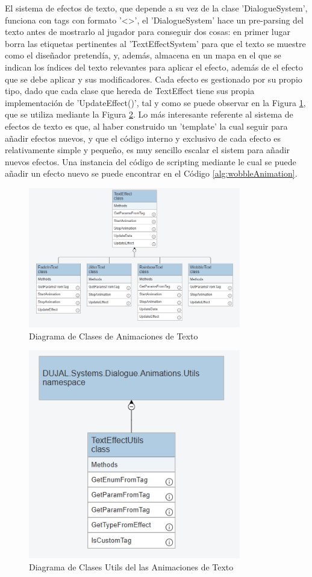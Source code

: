 El sistema de efectos de texto, que depende a su vez de la clase 'DialogueSystem', funciona con tags con formato '<>', el 'DialogueSystem' hace un pre-parsing del texto antes de mostrarlo al jugador para conseguir dos cosas:
en primer lugar borra las etiquetas pertinentes al 'TextEffectSystem' para que el texto se muestre como el diseñador pretendía, y, además, almacena en un mapa en el que se indican los índices del texto relevantes para aplicar 
el efecto, además de el efecto que se debe aplicar y sus modificadores. Cada efecto es gestionado por su propio tipo, dado que cada clase que hereda de TextEffect tiene sus propia implementación de 'UpdateEffect()',
tal y como se puede observar en la Figura \ref{fig:dialogueUml3}, que se utiliza mediante la Figura \ref{fig:dialogueUml4}. Lo más interesante referente al sistema de efectos de texto es que, al haber construido un
'template' la cual seguir para añadir efectos nuevos, y que el código interno y exclusivo de cada efecto es relativamente simple y pequeño, es muy sencillo escalar el sistem para añadir nuevos efectos. Una instancia
 del código de scripting mediante le cual se puede añadir un efecto nuevo se puede encontrar en el Código \ref{alg:wobbleAnimation}.

\begin{figure}[H]
  \centering
    \includegraphics[width=350px,clip=true]{Text_Effects.png}
  \caption{Diagrama de Clases de Animaciones de Texto}
  \label{fig:dialogueUml3}
\end{figure}


\begin{figure}[H]
  \centering
    \includegraphics[width=350px,clip=true]{Text_Effect_Utils.png}
  \caption{Diagrama de Clases Utils del las Animaciones de Texto}
  \label{fig:dialogueUml4}
\end{figure}

